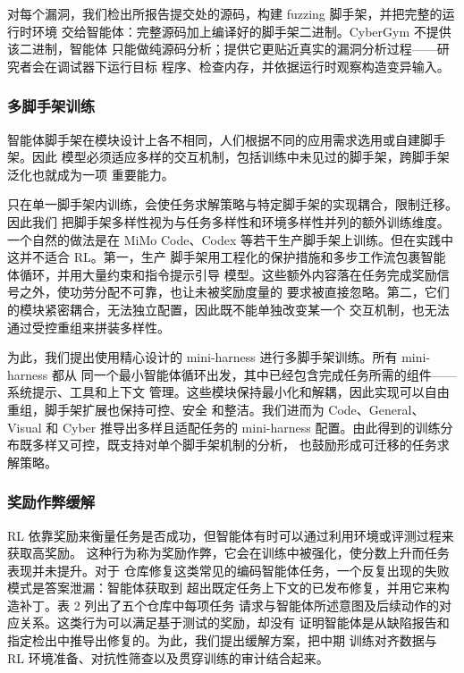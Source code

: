 \documentclass[
  10
]{article}
\begin{document}
对每个漏洞，我们检出所报告提交处的源码，构建 fuzzing 脚手架，并把完整的运行时环境
交给智能体：完整源码加上编译好的脚手架二进制。CyberGym 不提供该二进制，智能体
只能做纯源码分析；提供它更贴近真实的漏洞分析过程——研究者会在调试器下运行目标
程序、检查内存，并依据运行时观察构造变异输入。



\subsubsection{多脚手架训练}\label{multi-harness-training}

智能体脚手架在模块设计上各不相同，人们根据不同的应用需求选用或自建脚手架。因此
模型必须适应多样的交互机制，包括训练中未见过的脚手架，跨脚手架泛化也就成为一项
重要能力。

只在单一脚手架内训练，会使任务求解策略与特定脚手架的实现耦合，限制迁移。因此我们
把脚手架多样性视为与任务多样性和环境多样性并列的额外训练维度。一个自然的做法是在
MiMo Code、Codex 等若干生产脚手架上训练。但在实践中这并不适合 RL。第一，生产
脚手架用工程化的保护措施和多步工作流包裹智能体循环，并用大量约束和指令提示引导
模型。这些额外内容落在任务完成奖励信号之外，使功劳分配不可靠，也让未被奖励度量的
要求被直接忽略。第二，它们的模块紧密耦合，无法独立配置，因此既不能单独改变某一个
交互机制，也无法通过受控重组来拼装多样性。

为此，我们提出使用精心设计的 mini-harness 进行多脚手架训练。所有 mini-harness 都从
同一个最小智能体循环出发，其中已经包含完成任务所需的组件——系统提示、工具和上下文
管理。这些模块保持最小化和解耦，因此实现可以自由重组，脚手架扩展也保持可控、安全
和整洁。我们进而为 Code、General、Visual 和 Cyber 推导出多样且适配任务的
mini-harness 配置。由此得到的训练分布既多样又可控，既支持对单个脚手架机制的分析，
也鼓励形成可迁移的任务求解策略。

\subsubsection{奖励作弊缓解}\label{reward-hacking-mitigation}

RL 依靠奖励来衡量任务是否成功，但智能体有时可以通过利用环境或评测过程来获取高奖励。
这种行为称为奖励作弊，它会在训练中被强化，使分数上升而任务表现并未提升。对于
仓库修复这类常见的编码智能体任务，一个反复出现的失败模式是答案泄漏：智能体获取到
超出既定任务上下文的已发布修复，并用它来构造补丁。表 2 列出了五个仓库中每项任务
请求与智能体所述意图及后续动作的对应关系。这类行为可以满足基于测试的奖励，却没有
证明智能体是从缺陷报告和指定检出中推导出修复的。为此，我们提出缓解方案，把中期
训练对齐数据与 RL 环境准备、对抗性筛查以及贯穿训练的审计结合起来。
\end{document}
